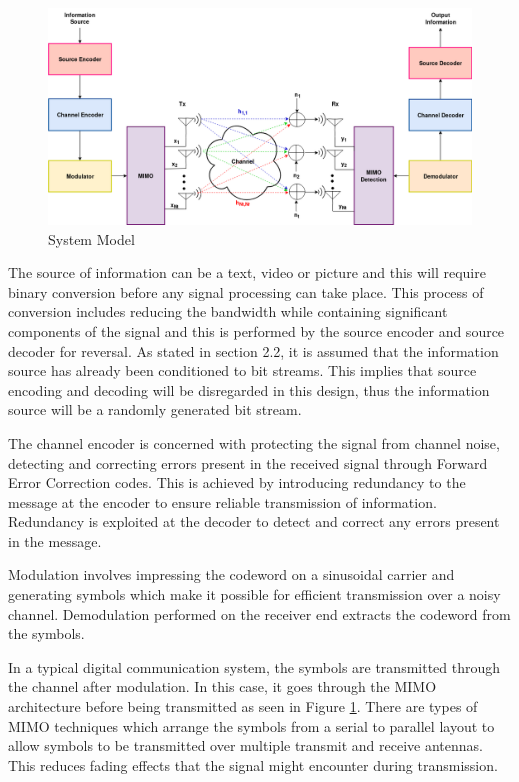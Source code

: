 \documentclass[pdftex,11pt,a4paper]{article}
\begin{document}
\begin{figure}[h!]
    \centering
    \includegraphics[width=\textwidth]{system5.png}
    \caption{System Model}
    \label{fig:1}
\end{figure}{}

The source of information can be a text, video or picture and this will require binary conversion before any signal processing can take place. This process of conversion includes reducing the bandwidth while containing significant components of the signal and this is performed by the source encoder and source decoder for reversal. As stated in section 2.2, it is assumed that the information source has already been conditioned to bit streams. This implies that source encoding and decoding will be disregarded in this design, thus the information source will be a randomly generated bit stream. 

The channel encoder is concerned with protecting the signal from channel noise, detecting and correcting errors present in the received signal through Forward Error Correction codes. This is achieved by introducing redundancy to the message at the encoder to ensure reliable transmission of information. Redundancy is exploited at the decoder to detect and correct any errors present in the message. 

Modulation involves impressing the codeword on a sinusoidal carrier and generating symbols which make it possible for efficient transmission over a noisy channel. Demodulation performed on the receiver end extracts the codeword from the symbols.

In a typical digital communication system, the symbols are transmitted through the channel after modulation. In this case, it goes through the MIMO architecture before being transmitted as seen in Figure \ref{fig:1}. There are types of MIMO techniques which arrange the symbols from a serial to parallel layout to allow symbols to be transmitted over multiple transmit and receive antennas. This reduces fading effects that the signal might encounter during transmission.
\end{document}
